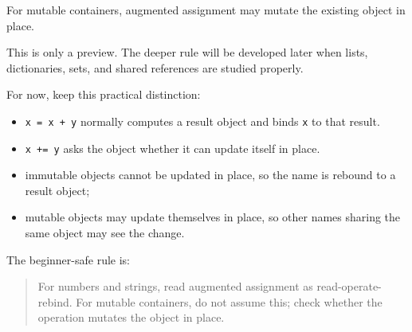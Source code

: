 For mutable containers, augmented assignment may mutate the existing object in place.

This is only a preview. The deeper rule will be developed later when lists, dictionaries, sets, and shared references are studied properly.

For now, keep this practical distinction:

\begin{itemize}
    \item \texttt{x = x + y} normally computes a result object and binds \texttt{x} to that result.
    \item \texttt{x += y} asks the object whether it can update itself in place.
    \item immutable objects cannot be updated in place, so the name is rebound to a result object;
    \item mutable objects may update themselves in place, so other names sharing the same object may see the change.
\end{itemize}

The beginner-safe rule is:

\begin{quote}
For numbers and strings, read augmented assignment as read-operate-rebind. For mutable containers, do not assume this; check whether the operation mutates the object in place.
\end{quote}